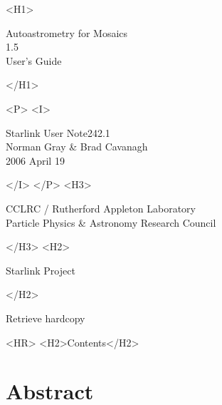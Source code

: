 \documentclass[twoside,11pt]{article}
\newcommand{\stardoccategory}  {Starlink User Note}
\newcommand{\stardocsource}    {sun242.1}
\newcommand{\stardocnumber}    {242.1}
\newcommand{\stardocauthors}   {Norman Gray \& Brad Cavanagh}
\newcommand{\stardocdate}      {2006 April 19}
\newcommand{\stardoctitle}     {Autoastrometry for Mosaics}
\newcommand{\stardocversion}   {1.5}
\newcommand{\stardocmanual}    {User's Guide}
\newcommand{\htmladdnormallink}[2]{#1}
\newcommand{\htmladdimg}[1]{}
\newcommand{\htmlref}[2]{#1}
\newcommand{\htmladdtonavigation}[1]{}
\newcommand{\xlabel}[1]{}
\newcommand{\latexonlytoc}[0]{\tableofcontents}
\begin{document}
\begin{htmlonly}
   \xlabel{}
   \begin{rawhtml} <H1> \end{rawhtml}
      \stardoctitle\\
      \stardocversion\\
      \stardocmanual
   \begin{rawhtml} </H1> \end{rawhtml}


   \begin{rawhtml} <P> <I> \end{rawhtml}
   \stardoccategory \stardocnumber \\
   \stardocauthors \\
   \stardocdate
   \begin{rawhtml} </I> </P> <H3> \end{rawhtml}
      \htmladdnormallink{CCLRC}{http://www.cclrc.ac.uk} /
      \htmladdnormallink{Rutherford Appleton Laboratory}
                        {http://www.cclrc.ac.uk/ral} \\
      \htmladdnormallink{Particle Physics \& Astronomy Research Council}
                        {http://www.pparc.ac.uk} \\
   \begin{rawhtml} </H3> <H2> \end{rawhtml}
      \htmladdnormallink{Starlink Project}{http://www.starlink.rl.ac.uk/}
   \begin{rawhtml} </H2> \end{rawhtml}
   \htmladdnormallink{\htmladdimg{source.gif} Retrieve hardcopy}
      {http://www.starlink.rl.ac.uk/cgi-bin/hcserver?\stardocsource}\\

  \label{stardoccontents}
  \begin{rawhtml}
    <HR>
    <H2>Contents</H2>
  \end{rawhtml}
  \renewcommand{\latexonlytoc}[0]{}
  \htmladdtonavigation{\htmlref{\htmladdimg{contents_motif.gif}}
        {stardoccontents}}

  \section{\xlabel{abstract}Abstract}
\end{htmlonly}
\end{document}
